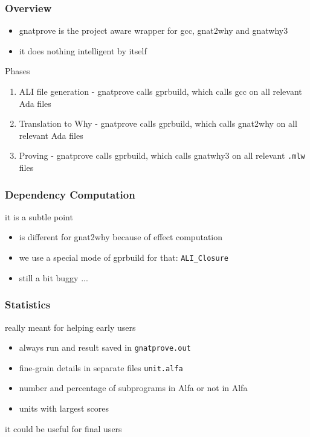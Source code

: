 \documentclass{beamer}
\newcommand{\vs}{\vspace{0.5cm}}
\newenvironment{specialframe}{%
  \begin{frame}[fragile,environment=specialframe]}{\end{frame}}
\begin{document}
\begin{specialframe}\frametitle{Overview}
   \begin{itemize}
      \item gnatprove is the project aware wrapper for gcc, gnat2why and
      gnatwhy3
      \item it does nothing intelligent by itself
   \end{itemize}

\vs

   \begin{block}{Phases}
      \begin{enumerate}
         \item ALI file generation - gnatprove calls gprbuild, which calls gcc
         on all relevant Ada files
         \item Translation to Why - gnatprove calls gprbuild, which calls
         gnat2why on all relevant Ada files
         \item Proving - gnatprove calls gprbuild, which calls gnatwhy3 on all
         relevant \verb|.mlw| files
      \end{enumerate}
   \end{block}
\end{specialframe}

\begin{specialframe}\frametitle{Dependency Computation}
it is a subtle point
      \begin{itemize}
         \item is different for gnat2why because of effect computation
         \item we use a special mode of gprbuild for that: \verb|ALI_Closure|
         \item still a bit buggy ...
      \end{itemize}
\end{specialframe}

\begin{specialframe}\frametitle{Statistics}
really meant for helping early users
      \begin{itemize}
         \item always run and result saved in \verb|gnatprove.out|
         \item fine-grain details in separate files \verb|unit.alfa|
         \item number and percentage of subprograms in Alfa or not in Alfa
         \item units with largest scores
      \end{itemize}
\vs

it could be useful for final users
\end{specialframe}
\end{document}
